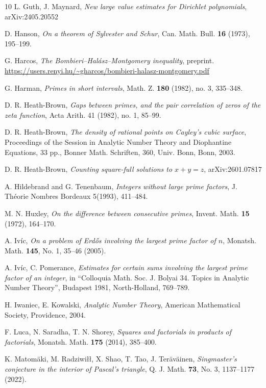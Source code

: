 \documentclass[12pt]{amsart}
\begin{document}
\begin{thebibliography}{10}
L. Guth, J. Maynard, \emph{New large value estimates for Dirichlet polynomials}, arXiv:2405.20552


D. Hanson, \emph{On a theorem of Sylvester and Schur}, Can. Math. Bull. \textbf{16} (1973), 195--199.

G. Harcos, \emph{The Bombieri--Hal\'asz--Montgomery inequality}, preprint. \url{https://users.renyi.hu/~gharcos/bombieri-halasz-montgomery.pdf}

G. Harman, \emph{Primes in short intervals}, Math. Z. \textbf{180} (1982), no. 3, 335--348.

D. R. Heath-Brown, \emph{Gaps between primes, and the pair correlation of zeros of the zeta function}, Acta Arith. 41 (1982), no. 1, 85–99.

D. R. Heath-Brown, \emph{The density of rational points on Cayley's cubic surface}, Proceedings of the Session in Analytic Number Theory and Diophantine Equations, 33 pp., Bonner Math. Schriften, 360, Univ. Bonn, Bonn, 2003.

D. R. Heath-Brown, \emph{Counting square-full solutions to $x+y=z$}, arXiv:2601.07817

A. Hildebrand and G. Tenenbaum, \emph{Integers without large prime factors}, J. Th\'eorie Nombres
Bordeaux 5(1993), 411--484.

M. N. Huxley, \emph{On the difference between consecutive primes}, Invent. Math. \textbf{15} (1972), 164--170.

A. Iv\'ic, \emph{On a problem of Erd\H{o}s involving the largest prime factor of $n$}, Monatsh. Math. \textbf{145}, No. 1, 35--46 (2005).

A. Iv\'ic, C. Pomerance, \emph{Estimates for certain sums involving the largest prime factor
of an integer}, in ``Colloquia Math. Soc. J. Bolyai 34. Topics in Analytic Number Theory'',
Budapest 1981, North-Holland, 769--789.

H. Iwaniec, E. Kowalski, \emph{Analytic Number Theory}, American Mathematical Society, Providence, 2004.

F. Luca, N. Saradha, T. N. Shorey, \emph{Squares and factorials in products of factorials}, Monatsh. Math. \textbf{175} (2014), 385--400.

    K. Matom\"aki, M. Radziwi{\l}{\l}, X. Shao, T. Tao, J. Ter\"av\"ainen,
\emph{Singmaster's conjecture in the interior of Pascal's triangle}, Q. J. Math. \textbf{73}, No. 3, 1137--1177 (2022).


\end{thebibliography}
\end{document}
